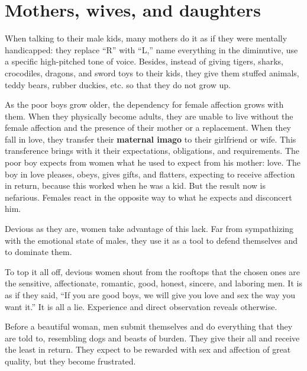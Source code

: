 \section{Mothers, wives, and daughters}

\par When talking to their male kids, many mothers do it as if they were mentally handicapped: they replace \enquote{R} with \enquote{L,} name everything in the diminutive, use a specific high-pitched tone of voice\footnotemark[14]. Besides, instead of giving tigers, sharks, crocodiles, dragons, and sword toys to their kids, they give them stuffed animals, teddy bears, rubber duckies, etc. so that they do not grow up.


\par As the poor boys grow older, the dependency for female affection grows with them. When they physically become adults, they are unable to live without the female affection and the presence of their mother or a replacement. When they fall in love, they transfer their \textbf{maternal imago} to their girlfriend or wife. This transference brings with it their expectations, obligations, and requirements. The poor boy expects from women what he used to expect from his mother: love. The boy in love pleases, obeys, gives gifts, and flatters, expecting to receive affection in return, because this worked when he was a kid. But the result now is nefarious. Females react in the opposite way to what he expects and disconcert him.

\par Devious as they are, women take advantage of this lack. Far from sympathizing with the emotional state of males, they use it as a tool to defend themselves and to dominate them.

\par To top it all off, devious women shout from the rooftops that the chosen ones are the sensitive, affectionate, romantic, good, honest, sincere, and laboring men. It is as if they said, \enquote{If you are good boys, we will give you love and sex the way you want it.} It is all a lie. Experience and direct observation reveals otherwise.

\par Before a beautiful woman, men submit themselves and do everything that they are told to, resembling dogs and beasts of burden. They give their all and receive the least in return. They expect to be rewarded with sex and affection of great quality, but they become frustrated.

